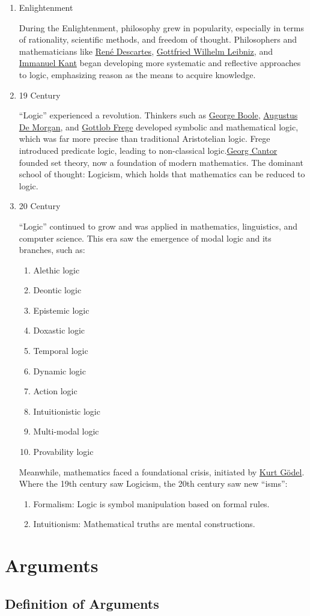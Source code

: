 \documentclass[12pt,a4paper]{book}
\begin{document}
\begin{enumerate}
\item Enlightenment

During the Enlightenment, philosophy grew in popularity, especially in
terms of rationality, scientific methods, and freedom of thought.
Philosophers and mathematicians like
\href{https://en.wikipedia.org/wiki/Ren\%C3\%A9_Descartes}{René
Descartes},
\href{https://en.wikipedia.org/wiki/Gottfried_Wilhelm_Leibniz}{Gottfried
Wilhelm Leibniz}, and
\href{https://en.wikipedia.org/wiki/Immanuel_Kant}{Immanuel Kant} began
developing more systematic and reflective approaches to logic,
emphasizing reason as the means to acquire knowledge.

\item 19 Century

``Logic'' experienced a revolution. Thinkers such as
\href{https://simple.wikipedia.org/wiki/George_Boole}{George Boole},
\href{https://en.wikipedia.org/wiki/Augustus_De_Morgan}{Augustus De
Morgan}, and \href{https://id.wikipedia.org/wiki/Gottlob_Frege}{Gottlob
Frege} developed symbolic and mathematical logic, which was far more
precise than traditional Aristotelian logic. Frege introduced predicate
logic, leading to non-classical
logic.\href{https://id.wikipedia.org/wiki/Georg_Cantor}{Georg Cantor}
founded set theory, now a foundation of modern mathematics. The dominant
school of thought: Logicism, which holds that mathematics can be reduced
to logic.

\item 20 Century

``Logic'' continued to grow and was applied in mathematics, linguistics,
and computer science. This era saw the emergence of modal logic and its
branches, such as:

\begin{enumerate}
\item Alethic logic
\item Deontic logic
\item Epistemic logic
\item Doxastic logic
\item Temporal logic
\item Dynamic logic
\item Action logic
\item Intuitionistic logic
\item Multi-modal logic
\item Provability logic
\end{enumerate}

Meanwhile, mathematics faced a foundational crisis, initiated by \href{https://id.wikipedia.org/wiki/Kurt_G\%C3\%B6del}{Kurt Gödel}.
Where the 19th century saw Logicism, the 20th century saw new ``isms'':

\begin{enumerate}
\item
  Formalism: Logic is symbol manipulation based on formal rules.
\item
  Intuitionism: Mathematical truths are mental constructions.
\end{enumerate}
\end{enumerate}

\chapter{Arguments}
\section{Definition of Arguments}\label{definition-of-arguments}
\end{document}
